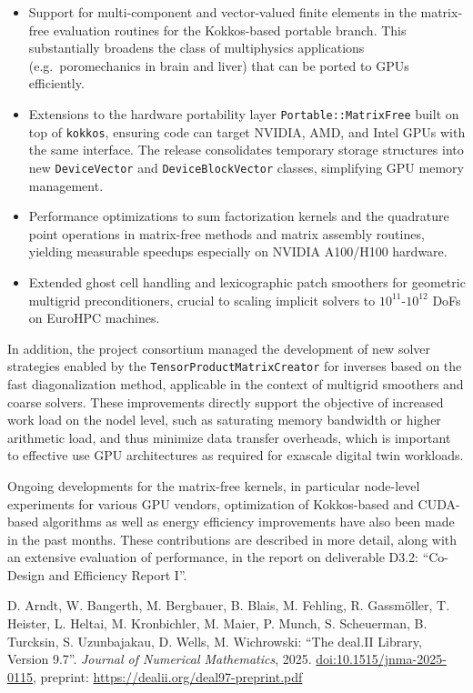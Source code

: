 \documentclass[a4paper,12pt, numbers]{article}
\begin{document}
	
	\begin{itemize}
		\item Support for multi-component and vector-valued finite elements in the
		matrix-free evaluation routines for the Kokkos-based portable branch. This substantially broadens the class
		of multiphysics applications (e.g.\ poromechanics in brain and liver)
		that can be ported to GPUs efficiently.
		\item Extensions to the hardware portability layer \texttt{Portable::MatrixFree} built on top of
		\texttt{kokkos}, ensuring code can target NVIDIA, AMD, and Intel GPUs with the
		same interface. The release consolidates temporary storage structures
		into new \texttt{DeviceVector} and \texttt{DeviceBlockVector} classes,
		simplifying GPU memory management.
              \item Performance optimizations to sum factorization kernels and
                the quadrature point operations in matrix-free methods and
                matrix assembly routines, yielding measurable speedups
                especially on NVIDIA A100/H100 hardware.
		\item Extended ghost cell handling and lexicographic patch smoothers for
		geometric multigrid preconditioners, crucial to scaling implicit solvers
		to $10^{11}$-$10^{12}$ DoFs on EuroHPC machines.
	\end{itemize}
	
	In addition, the project consortium managed the development of new solver strategies enabled by the
	\texttt{TensorProductMatrixCreator} for inverses based on the fast diagonalization method,
	applicable in the context of multigrid smoothers and coarse solvers.
	These improvements directly support the objective of increased work load on the nodel level, such as saturating memory
	bandwidth or higher arithmetic load, and thus minimize data transfer overheads, which is important to effective use GPU architectures as required for
	exascale digital twin workloads.
	
	Ongoing developments for the matrix-free kernels, in particular node-level
	experiments for various GPU vendors, optimization of Kokkos-based and
	CUDA-based algorithms as well as energy efficiency improvements have also been
	made in the past months. These contributions are described in more detail,
	along with an extensive evaluation of performance, in the report on
	deliverable D3.2: ``Co-Design and Efficiency Report I''.
	
	\begin{thebibliography}{10}
         D. Arndt, W. Bangerth, M. Bergbauer, B. Blais,
          M. Fehling, R. Gassmöller, T. Heister, L. Heltai, M. Kronbichler,
          M. Maier, P. Munch, S. Scheuerman, B. Turcksin, S. Uzunbajakau,
          D. Wells, M. Wichrowski: ``The deal.II Library, Version 9.7''.
          \emph{Journal of Numerical Mathematics}, 2025.
          \href{https://doi.org/10.1515/jnma-2025-0115}{doi:10.1515/jnma-2025-0115},
          preprint: \url{https://dealii.org/deal97-preprint.pdf}
	\end{thebibliography}
	
\end{document}
